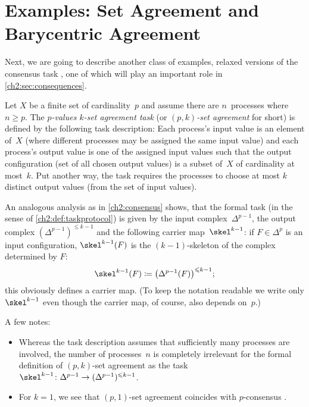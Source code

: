 \section{Examples: Set Agreement and Barycentric Agreement}
Next, we are going to describe another class of examples, relaxed versions of
the consensus task , one of which will play an important
role in \cref{ch2:sec:consequences}.

\begin{thExample}
    \label{ch2:setagreement}
    Let $X$ be a finite set of cardinality~$p$ and assume there are
    $n$~processes where $n\geq p$.  The \emph{$p$-values $k$-set
    agreement task} (or \emph{$(p,k)$-set agreement} for short) is
    defined by the following task description:
    Each process's input value is an element of~$X$ (where different
    processes may be assigned the same input value) and each process's
    output value is one of the assigned input values such that
    the output configuration (set of all chosen output values)
    is a subset of~$X$ of cardinality at most~$k$. Put another way,
    the task requires the processes to choose at most $k$ distinct
    output values (from the set of input values).
    
    An analogous analysis as in \cref{ch2:consensus} shows, that
    the formal task (in the sense of \cref{ch2:def:taskprotocol})
    is given by the input complex~$\Delta^{p-1}$, the output complex
    $(\Delta^{p-1})^{\leq k-1}$ and the following carrier map~$\skel^{k-1}$:
    if $F\in\Delta^p$ is an input configuration, $\skel^{k-1}(F)$ is the
    $(k{-}1)$-skeleton of the complex determined by $F$:
    \[ \skel^{k-1}(F) \defeq \bigl(\Delta^{p-1}(F)\bigr)^{\leq k-1}
    ; \]
    this obviously defines a carrier map. (To keep the notation
    readable we write only $\skel^{k-1}$ even though the carrier map,
    of course, also depends on~$p$.)
    
    A few notes:
    \begin{itemize}
        \item
            Whereas the task description assumes that sufficiently many
            processes are involved, the number of processes~$n$ is completely
            irrelevant for the formal definition of $(p,k)$-set agreement
            as the task
            $\skel^{k-1}\colon\Delta^{p-1}\to(\Delta^{p-1})^{\leq k-1}$.
            
        \item
            For $k=1$, we see that $(p,1)$-set agreement coincides with
            $p$-consensus .
            

\end{itemize}
\end{thExample}
